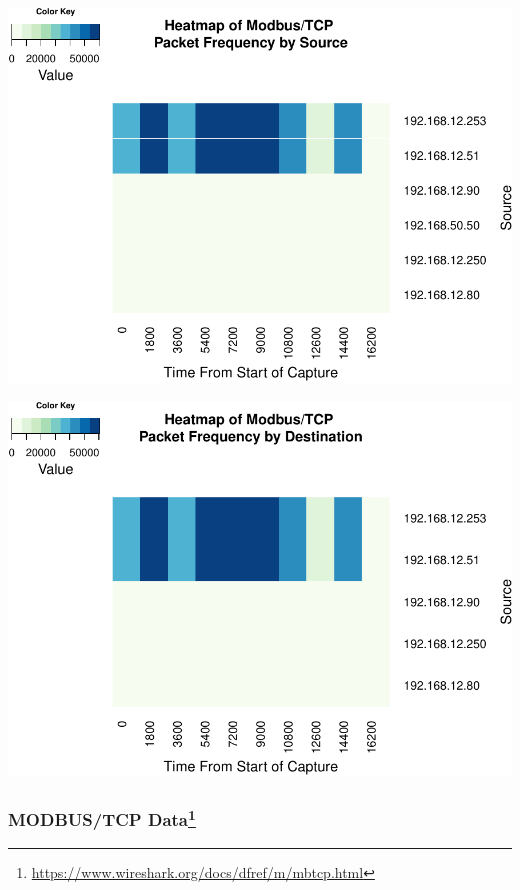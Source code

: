 \documentclass[]{article}
\let\rmarkdownfootnote\footnote%
\def\footnote{\protect\rmarkdownfootnote}
\begin{document}
\begin{center}\includegraphics{edaReport_files/figure-latex/unnamed-chunk-28-1} \end{center}

\begin{center}\includegraphics{edaReport_files/figure-latex/unnamed-chunk-29-1} \end{center}

\subsubsection[MODBUS/TCP Data]{MODBUS/TCP Data\footnote{\url{https://www.wireshark.org/docs/dfref/m/mbtcp.html}}}\label{modbustcp-data5}
\end{document}
